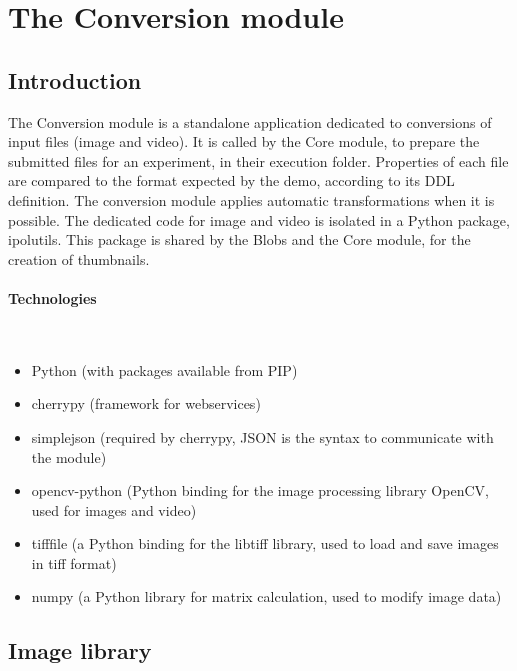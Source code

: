 \section{The Conversion module}
\label{sec:conversion}


\subsection{Introduction}
\label{sec:conversion_introduction}

The Conversion module is a standalone application dedicated to conversions of input files (image and video). It is called by the Core module, to prepare the submitted files for an experiment, in their execution folder. Properties of each file are compared to the format expected by the demo, according to its DDL definition. The conversion module applies automatic transformations when it is possible. The dedicated code for image and video is isolated in a Python package, ipolutils. This package is shared by the Blobs and the Core module, for the creation of thumbnails.

\paragraph{Technologies} \hspace{0pt} \\
\begin{itemize}
\item Python (with packages available from PIP)
\item cherrypy (framework for webservices)
\item simplejson (required by cherrypy, JSON is the syntax to communicate with the module)
\item opencv-python (Python binding for the image processing library OpenCV, used for images and video)
\item tifffile (a Python binding for the libtiff library, used to load and save images in tiff format)
\item numpy (a Python library for matrix calculation, used to modify image data)
\end{itemize}


\subsection{Image library}

